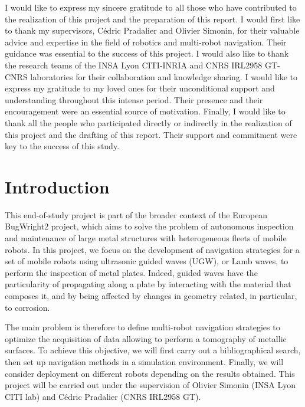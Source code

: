 \documentclass[english,RandD]{rapportPFE}  %
\begin{document}
	\begin{acknowledgements}
		I would like to express my sincere gratitude to all those who have contributed to the realization of this project and the preparation of this report.
		I would first like to thank my supervisors, Cédric Pradalier and Olivier Simonin, for their valuable advice and expertise in the field of robotics and multi-robot navigation.
		Their guidance was essential to the success of this project.
		I would also like to thank the research teams of the INSA Lyon CITI-INRIA and CNRS IRL2958 GT-CNRS laboratories for their collaboration and knowledge sharing.
		I would like to express my gratitude to my loved ones for their unconditional support and understanding throughout this intense period.
		Their presence and their encouragement were an essential source of motivation.
		Finally, I would like to thank all the people who participated directly or indirectly in the realization of this project and the drafting of this report.
		Their support and commitment were key to the success of this study.
	\end{acknowledgements}
	\setcounter{tocdepth}{3}
	\tableofcontents
	\cleardoublepage
	\section{Introduction}
		This end-of-study project is part of the broader context of the European BugWright2 project, which aims to solve the problem of autonomous inspection and maintenance of large metal structures with heterogeneous fleets of mobile robots.
		In this project, we focus on the development of navigation strategies for a set of mobile robots using ultrasonic guided waves (UGW), or Lamb waves, to perform the inspection of metal plates.
		Indeed, guided waves have the particularity of propagating along a plate by interacting with the material that composes it, and by being affected by changes in geometry related, in particular, to corrosion.

		The main problem is therefore to define multi-robot navigation strategies to optimize the acquisition of data allowing to perform a tomography of metallic surfaces.
		To achieve this objective, we will first carry out a bibliographical search, then set up navigation methods in a simulation environment.
		Finally, we will consider deployment on different robots depending on the results obtained.
		This project will be carried out under the supervision of Olivier Simonin (INSA Lyon CITI lab) and Cédric Pradalier (CNRS IRL2958 GT).
\end{document}
